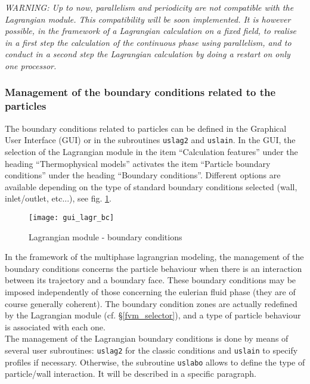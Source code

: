 {{{\noindent
\emph{WARNING: Up to now, parallelism and periodicity are not compatible with
the Lagrangian module. This compatibility will be soon implemented. It
is however possible, in the framework of a Lagrangian calculation on a
fixed field, to realise in a first step the calculation of the
continuous phase using parallelism, and to conduct in a second step the
Lagrangian calculation by doing a restart on only one processor.}

\subsubsection{Management of the boundary conditions related to the
  particles}
The boundary conditions related to particles can be defined in the 
Graphical User Interface (GUI) or in the subroutines \texttt{uslag2} and 
\texttt{uslain}. In the GUI, the selection of the Lagrangian module in the 
item ``Calculation features'' under the heading ``Thermophysical models''
 activates the item ``Particle boundary conditions'' under the heading 
``Boundary conditions''. Different options are available depending on the
 type of standard boundary conditions selected (wall, inlet/outlet, etc...),
 see fig. \ref{fig:CL-Lag}.

\begin{figure}[ht]
\begin{center}
\texttt{[image: gui\_lagr\_bc]}
\caption{Lagrangian module - boundary conditions}
\label{fig:CL-Lag}
\end{center}
\end{figure}

\noindent
In the framework of the multiphase lagrangrian modeling, the management
of the boundary conditions concerns the particle behaviour when there
is an interaction between its trajectory and a boundary face. These
boundary conditions may be imposed independently of those concerning the
eulerian fluid phase (they are of course generally coherent). The
boundary condition zones are actually redefined by the Lagrangian
module (cf. \S\ref{fvm_selector}), and a type of particle behaviour
is associated with each one. \\
The management of the Lagrangian boundary conditions is done by means of
several user subroutines: \texttt{uslag2} for the classic conditions and
\texttt{uslain} to specify profiles if necessary. Otherwise, the
subroutine \texttt{uslabo} allows to define the type of particle/wall
interaction. It will be described in a specific paragraph.

}}}

